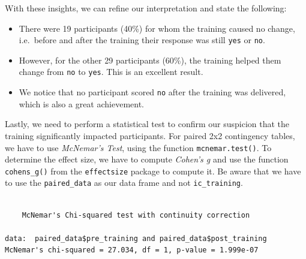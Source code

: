 \documentclass[
  letterpaper,
]{krantz}
\makeatletter
\newenvironment{Shaded}{\begin{snugshade}}{\end{snugshade}}
\newcommand{\CommentTok}[1]{\textcolor[rgb]{0.37,0.37,0.37}{#1}}
\newcommand{\FunctionTok}[1]{\textcolor[rgb]{0.28,0.35,0.67}{#1}}
\newcommand{\NormalTok}[1]{\textcolor[rgb]{0.00,0.23,0.31}{#1}}
\newcommand{\SpecialCharTok}[1]{\textcolor[rgb]{0.37,0.37,0.37}{#1}}
\newenvironment{kframe}{%
\medskip{}
\setlength{\fboxsep}{.8em}
 \def\at@end@of@kframe{}%
 \ifinner\ifhmode%
  \def\at@end@of@kframe{\end{minipage}}%
  \begin{minipage}{\columnwidth}%
 \fi\fi%
 \def\FrameCommand##1{\hskip\@totalleftmargin \hskip-\fboxsep
 \colorbox{shadecolor}{##1}\hskip-\fboxsep
     \hskip-\linewidth \hskip-\@totalleftmargin \hskip\columnwidth}%
 \MakeFramed {\advance\hsize-\width
   \@totalleftmargin\z@ \linewidth\hsize
   \@setminipage}}%
 {\par\unskip\endMakeFramed%
 \at@end@of@kframe}
\renewenvironment{Shaded}{\begin{kframe}}{\end{kframe}}
\makeatother
\begin{document}
With these insights, we can refine our interpretation and state the
following:

\begin{itemize}
\item
  There were 19 participants (40\%) for whom the training caused no
  change, i.e.~before and after the training their response was still
  \texttt{yes} or \texttt{no}.
\item
  However, for the other 29 participants (60\%), the training helped
  them change from \texttt{no} to \texttt{yes}. This is an excellent
  result.
\item
  We notice that no participant scored \texttt{no} after the training
  was delivered, which is also a great achievement.
\end{itemize}

Lastly, we need to perform a statistical test to confirm our suspicion
that the training significantly impacted participants. For paired 2x2
contingency tables, we have to use \emph{McNemar's Test}, using the
function \texttt{mcnemar.test()}. To determine the effect size, we have
to compute \emph{Cohen's g} and use the function \texttt{cohens\_g()}
from the \texttt{effectsize} package to compute it. Be aware that we
have to use the \texttt{paired\_data} as our data frame and not
\texttt{ic\_training}.

\begin{Shaded}
\end{Shaded}

\begin{verbatim}

    McNemar's Chi-squared test with continuity correction

data:  paired_data$pre_training and paired_data$post_training
McNemar's chi-squared = 27.034, df = 1, p-value = 1.999e-07
\end{verbatim}

\begin{Shaded}
\end{Shaded}
\end{document}
